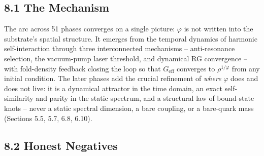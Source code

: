 \documentclass[
  11pt,
]{article}
\begin{document}
\subsection{8.1 The Mechanism}\label{the-mechanism}

The arc across 51 phases converges on a single picture: \(\varphi\) is
not written into the substrate's spatial structure. It emerges from the
temporal dynamics of harmonic self-interaction through three
interconnected mechanisms -- anti-resonance selection, the vacuum-pump
laser threshold, and dynamical RG convergence -- with fold-density
feedback closing the loop so that \(G_{\text{eff}}\) converges to
\(\rho^{1/\varphi}\) from any initial condition. The later phases add
the crucial refinement of \emph{where} \(\varphi\) does and does not
live: it is a dynamical attractor in the time domain, an exact
self-similarity and parity in the static spectrum, and a structural law
of bound-state knots -- never a static spectral dimension, a bare
coupling, or a bare-quark mass (Sections 5.5, 5.7, 6.8, 6.10).

\subsection{8.2 Honest Negatives}\label{honest-negatives}
\end{document}
